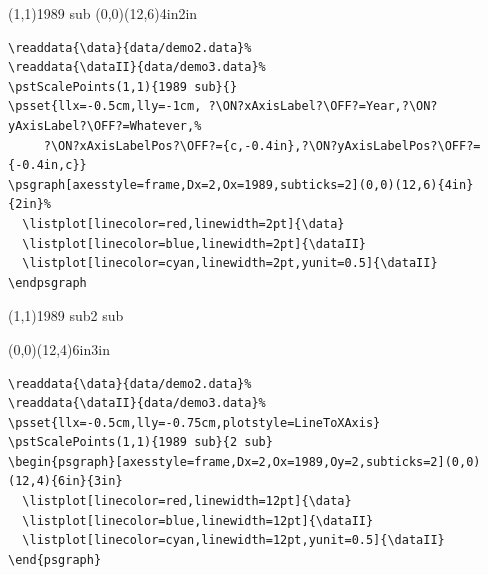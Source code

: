 \documentclass[11pt,english,BCOR=10mm,DIV=12,bibliography=totoc,parskip=false,headings=small,
    headinclude=false,footinclude=false,twoside]{pst-doc}
\begin{document}
\begin{center}
%
%
\pstScalePoints(1,1){1989 sub}{}
\psgraph[axesstyle=frame,Dx=2,Ox=1989,subticks=2](0,0)(12,6){4in}{2in}%
  \listplot[linecolor=red,linewidth=2pt]{\data}
  \listplot[linecolor=blue,linewidth=2pt]{\dataII}
  \listplot[linecolor=cyan,linewidth=2pt,yunit=0.5]{\dataII}
\endpsgraph
\end{center}

\begin{lstlisting}
\readdata{\data}{data/demo2.data}%
\readdata{\dataII}{data/demo3.data}%
\pstScalePoints(1,1){1989 sub}{}
\psset{llx=-0.5cm,lly=-1cm, ?\ON?xAxisLabel?\OFF?=Year,?\ON?yAxisLabel?\OFF?=Whatever,%
     ?\ON?xAxisLabelPos?\OFF?={c,-0.4in},?\ON?yAxisLabelPos?\OFF?={-0.4in,c}}
\psgraph[axesstyle=frame,Dx=2,Ox=1989,subticks=2](0,0)(12,6){4in}{2in}%
  \listplot[linecolor=red,linewidth=2pt]{\data}
  \listplot[linecolor=blue,linewidth=2pt]{\dataII}
  \listplot[linecolor=cyan,linewidth=2pt,yunit=0.5]{\dataII}
\endpsgraph
\end{lstlisting}

\begin{center}
%
%
\pstScalePoints(1,1){1989 sub}{2 sub}
\begin{psgraph}[axesstyle=frame,Dx=2,Ox=1989,Oy=2,subticks=2](0,0)(12,4){6in}{3in}
  \listplot[linecolor=red,linewidth=12pt]{\data}
  \listplot[linecolor=blue,linewidth=12pt]{\dataII}
  \listplot[linecolor=cyan,linewidth=12pt,yunit=0.5]{\dataII}
\end{psgraph}
\end{center}

\begin{lstlisting}
\readdata{\data}{data/demo2.data}%
\readdata{\dataII}{data/demo3.data}%
\psset{llx=-0.5cm,lly=-0.75cm,plotstyle=LineToXAxis}
\pstScalePoints(1,1){1989 sub}{2 sub}
\begin{psgraph}[axesstyle=frame,Dx=2,Ox=1989,Oy=2,subticks=2](0,0)(12,4){6in}{3in}
  \listplot[linecolor=red,linewidth=12pt]{\data}
  \listplot[linecolor=blue,linewidth=12pt]{\dataII}
  \listplot[linecolor=cyan,linewidth=12pt,yunit=0.5]{\dataII}
\end{psgraph}
\end{lstlisting}
\end{document}
